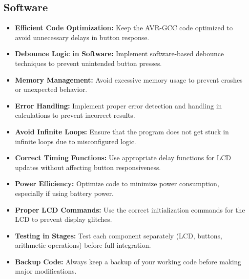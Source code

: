 \documentclass[a4paper,12pt]{article}
\theoremstyle{remark}
\begin{document}
\subsection{Software}
\begin{itemize}
    \item \textbf{Efficient Code Optimization:} Keep the AVR-GCC code optimized to avoid unnecessary delays in button response.
    \item \textbf{Debounce Logic in Software:} Implement software-based debounce techniques to prevent unintended button presses.
    \item \textbf{Memory Management:} Avoid excessive memory usage to prevent crashes or unexpected behavior.
    \item \textbf{Error Handling:} Implement proper error detection and handling in calculations to prevent incorrect results.
     \item \textbf{Avoid Infinite Loops:} Ensure that the program does not get stuck in infinite loops due to misconfigured logic.
    \item \textbf{Correct Timing Functions:} Use appropriate delay functions for LCD updates without affecting button responsiveness.
    \item \textbf{Power Efficiency:} Optimize code to minimize power consumption, especially if using battery power.
    \item \textbf{Proper LCD Commands:} Use the correct initialization commands for the LCD to prevent display glitches.
    \item \textbf{Testing in Stages:} Test each component separately (LCD, buttons, arithmetic operations) before full integration.
    \item \textbf{Backup Code:} Always keep a backup of your working code before making major modifications.
\end{itemize}
\end{document}
